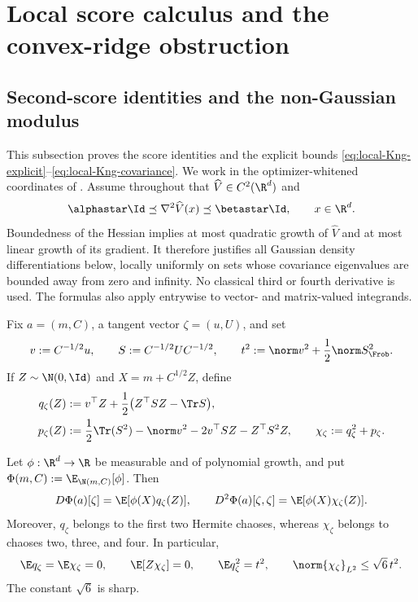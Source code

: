 \section{Local score calculus and the convex-ridge obstruction}
\label{app:local-ridge}

\subsection{Second-score identities and the non-Gaussian modulus}
\label{app:local-moduli}

This subsection proves the score identities and the explicit bounds
\eqref{eq:local-Kng-explicit}--\eqref{eq:local-Kng-covariance}.  We work in
the optimizer-whitened coordinates of .  Assume
throughout that \(\widehat V\in C^2(\R^d)\) and
\[
  \alphastar\Id\preceq\nabla^2\widehat V(x)
  \preceq\betastar\Id,\qquad x\in\R^d.
\]
Boundedness of the Hessian implies at most quadratic growth of
\(\widehat V\) and at most linear growth of its gradient.  It therefore
justifies all Gaussian density differentiations below, locally uniformly on
sets whose covariance eigenvalues are bounded away from zero and infinity.
No classical third or fourth derivative is used.  The formulas also apply
entrywise to vector- and matrix-valued integrands.

Fix \(a=(m,C)\), a tangent vector \(\zeta=(u,U)\), and set
\begin{equation}
  v:=C^{-1/2}u,\qquad
  S:=C^{-1/2}UC^{-1/2},\qquad
  t^2:=\norm v^2+\frac12\norm S_{\Frob}^2.
  \label{eq:app-local-whitened-tangent}
\end{equation}
If \(Z\sim\N(0,\Id)\) and \(X=m+C^{1/2}Z\), define
\begin{align}
  q_\zeta(Z)
  &:=
  v^\top Z+\frac12\bigl(Z^\top SZ-\Tr S\bigr),
  \label{eq:app-local-first-score}\\
  p_\zeta(Z)
  &:=
  \frac12\Tr(S^2)-\norm v^2-2v^\top SZ-Z^\top S^2Z,
  \qquad
  \chi_\zeta:=q_\zeta^2+p_\zeta.
  \label{eq:app-local-second-score}
\end{align}

\begin{lemma}
\label{lem:app-local-second-score}
Let \(\phi:\R^d\to\R\) be measurable and of polynomial growth, and put
\(\Phi(m,C):=\E_{\N(m,C)}[\phi]\).  Then
\begin{equation}
  D\Phi(a)[\zeta]=\E[\phi(X)q_\zeta(Z)],
  \qquad
  D^2\Phi(a)[\zeta,\zeta]
  =\E[\phi(X)\chi_\zeta(Z)].
  \label{eq:app-local-score-identities}
\end{equation}
Moreover, \(q_\zeta\) belongs to the first two Hermite chaoses, whereas
\(\chi_\zeta\) belongs to chaoses two, three, and four.  In particular,
\begin{equation}
  \E q_\zeta=\E\chi_\zeta=0,\qquad
  \E[Z\chi_\zeta]=0,\qquad
  \E q_\zeta^2=t^2,\qquad
  \norm{\chi_\zeta}_{L^2}\leq\sqrt6\,t^2.
  \label{eq:app-local-score-moments}
\end{equation}
The constant \(\sqrt6\) is sharp.
\end{lemma}

